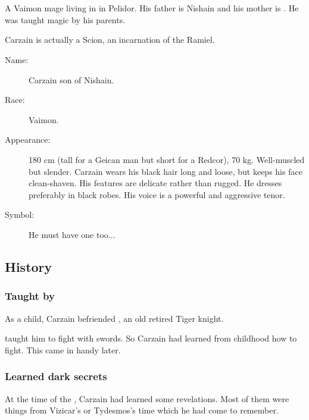 \section{\CarzainDeracilleShireyo}
A Vaimon mage living in \Redglen{} in Pelidor. 
His father is Nishain \Shireyo{} and his mother is \Roanne{} \Deracille. 
He was taught magic by his parents. 

Carzain is actually a Scion, an incarnation of the \Malach{} Ramiel. 

\begin{description}
  \item[Name:] {Carzain} son of {Nishain}. 
  \item[Race:] Vaimon. 
  \item[Appearance:] 
    180 cm (tall for a Geican man but short for a Redcor), 70 kg. Well-muscled but slender. Carzain wears his black hair long and loose, but keeps his face clean-shaven. His features are delicate rather than rugged. He dresses preferably in black robes. His voice is a powerful and aggressive tenor. 
  \item[Symbol:] He must have one too... 
\end{description}









\subsection{History}





\subsubsection[Taught by Weylon]{Taught by {\Weylon}}
As a child, Carzain befriended , an old retired Tiger knight. 

\Weylon{} taught him to fight with swords. 
So Carzain had learned from childhood how to fight. 
This came in handy later. 





\subsubsection{Learned dark secrets}
At the time of the , Carzain had learned some  revelations.
Most of them were things from Vizicar's or Tydesmos's time which he had come to remember. 

